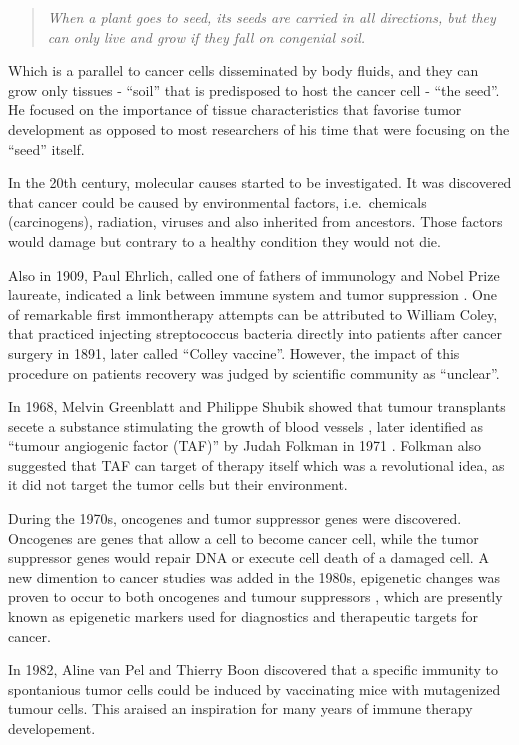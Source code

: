 \documentclass[12pt,]{book}
\theoremstyle{definition}
\theoremstyle{definition}
\theoremstyle{definition}
\theoremstyle{remark}
\begin{document}
\begin{quote}
\emph{When a plant goes to seed, its seeds are carried in all
directions, but they can only live and grow if they fall on congenial
soil.}
\end{quote}

Which is a parallel to cancer cells disseminated by body fluids, and
they can grow only tissues - ``soil'' that is predisposed to host the
cancer cell - ``the seed''. He focused on the importance of tissue
characteristics that favorise tumor development as opposed to most
researchers of his time that were focusing on the ``seed'' itself.

In the 20th century, molecular causes started to be investigated. It was
discovered that cancer could be caused by environmental factors,
i.e.~chemicals (carcinogens), radiation, viruses and also inherited from
ancestors. Those factors would damage but contrary to a healthy
condition they would not die.

Also in 1909, Paul Ehrlich, called one of fathers of immunology and
Nobel Prize laureate, indicated a link between immune system and tumor
suppression \citep{Ehrlich1909}. One of remarkable first immontherapy
attempts can be attributed to William Coley, that practiced injecting
streptococcus bacteria directly into patients after cancer surgery in
1891, later called ``Colley vaccine''. However, the impact of this
procedure on patients recovery was judged by scientific community as
``unclear''.

In 1968, Melvin Greenblatt and Philippe Shubik showed that tumour
transplants secete a substance stimulating the growth of blood vessels
\citep{Greenblatt1968}, later identified as ``tumour angiogenic factor
(TAF)'' by Judah Folkman in 1971 \citep{Folkman1971}. Folkman also
suggested that TAF can target of therapy itself which was a revolutional
idea, as it did not target the tumor cells but their environment.

During the 1970s, oncogenes and tumor suppressor genes were discovered.
Oncogenes are genes that allow a cell to become cancer cell, while the
tumor suppressor genes would repair DNA or execute cell death of a
damaged cell. A new dimention to cancer studies was added in the 1980s,
epigenetic changes was proven to occur to both oncogenes and tumour
suppressors \citep{Feinberg1983, Greger1989}, which are presently known
as epigenetic markers used for diagnostics and therapeutic targets for
cancer.

In 1982, Aline van Pel and Thierry Boon \citep{Pel1982} discovered that
a specific immunity to spontanious tumor cells could be induced by
vaccinating mice with mutagenized tumour cells. This araised an
inspiration for many years of immune therapy developement.
\end{document}
